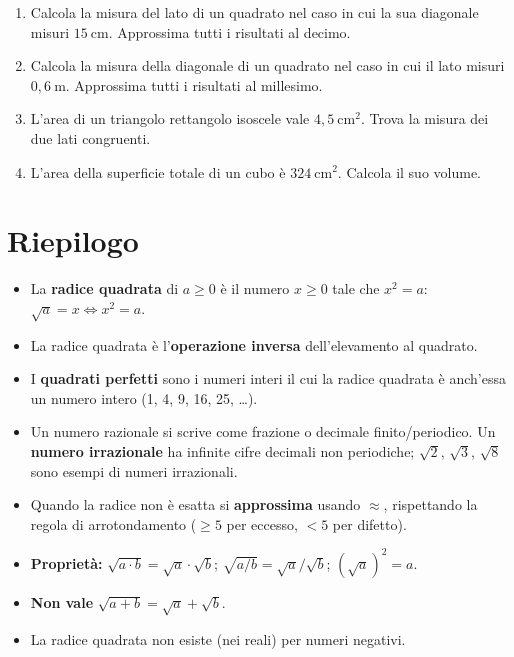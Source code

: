 \begin{enumerate}[label=\arabic*.]
    \item Calcola la misura del lato di un quadrato nel caso in cui la sua
          diagonale misuri \(15\ \text{cm}\). Approssima tutti i risultati al
          decimo.

    \item Calcola la misura della diagonale di un quadrato nel caso in cui il
          lato misuri \(0{,}6\ \text{m}\). Approssima tutti i risultati al
          millesimo.

    \item L'area di un triangolo rettangolo isoscele vale \(4{,}5\ \text{cm}^2\).
          Trova la misura dei due lati congruenti.

    \item L'area della superficie totale di un cubo è \(324\ \text{cm}^2\).
          Calcola il suo volume.

\end{enumerate}

\section{Riepilogo}

\begin{itemize}
    \item La \textbf{radice quadrata} di \(a \geq 0\) è il numero \(x \geq 0\)
          tale che \(x^2 = a\): \(\sqrt{a} = x \iff x^2 = a\).
    \item La radice quadrata è l'\textbf{operazione inversa} dell'elevamento
          al quadrato.
    \item I \textbf{quadrati perfetti} sono i numeri interi il cui la radice
          quadrata è anch'essa un numero intero (1, 4, 9, 16, 25, \ldots).
    \item Un numero razionale si scrive come frazione o decimale finito/periodico.
          Un \textbf{numero irrazionale} ha infinite cifre decimali non periodiche;
          \(\sqrt{2}\), \(\sqrt{3}\), \(\sqrt{8}\) sono esempi di numeri irrazionali.
    \item Quando la radice non è esatta si \textbf{approssima} usando \(\approx\),
          rispettando la regola di arrotondamento (\(\geq 5\) per eccesso,
          \(< 5\) per difetto).
    \item \textbf{Proprietà:} \(\sqrt{a \cdot b} = \sqrt{a}\cdot\sqrt{b}\);
          \(\sqrt{a/b} = \sqrt{a}/\sqrt{b}\); \((\sqrt{a})^2 = a\).
    \item \textbf{Non vale} \(\sqrt{a+b} = \sqrt{a}+\sqrt{b}\).
    \item La radice quadrata non esiste (nei reali) per numeri negativi.
\end{itemize}

